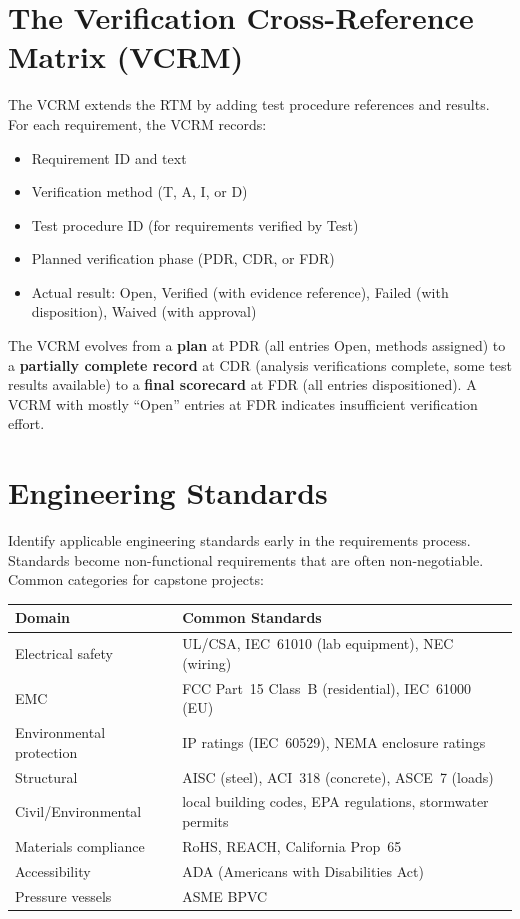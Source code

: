 \section{The Verification Cross-Reference Matrix (VCRM)}
The VCRM extends the RTM by adding test procedure references and results. For each requirement, the VCRM records:
\begin{itemize}[nosep,leftmargin=1.5em]
\item Requirement ID and text
\item Verification method (T, A, I, or D)
\item Test procedure ID (for requirements verified by Test)
\item Planned verification phase (PDR, CDR, or FDR)
\item Actual result: Open, Verified (with evidence reference), Failed (with disposition), Waived (with approval)
\end{itemize}

The VCRM evolves from a \textbf{plan} at PDR (all entries Open, methods assigned) to a \textbf{partially complete record} at CDR (analysis verifications complete, some test results available) to a \textbf{final scorecard} at FDR (all entries dispositioned). A VCRM with mostly ``Open'' entries at FDR indicates insufficient verification effort.

\section{Engineering Standards}
Identify applicable engineering standards early in the requirements process. Standards become non-functional requirements that are often non-negotiable. Common categories for capstone projects:

\begin{center}\small
\begin{tabularx}{\textwidth}{lX}
\toprule
\textbf{Domain} & \textbf{Common Standards} \\
\midrule
Electrical safety & UL/CSA, IEC~61010 (lab equipment), NEC (wiring) \\
EMC & FCC Part~15 Class~B (residential), IEC~61000 (EU) \\
Environmental protection & IP ratings (IEC~60529), NEMA enclosure ratings \\
Structural & AISC (steel), ACI~318 (concrete), ASCE~7 (loads) \\
Civil/Environmental & local building codes, EPA regulations, stormwater permits \\
Materials compliance & RoHS, REACH, California Prop~65 \\
Accessibility & ADA (Americans with Disabilities Act) \\
Pressure vessels & ASME BPVC \\
\bottomrule
\end{tabularx}
\end{center}

